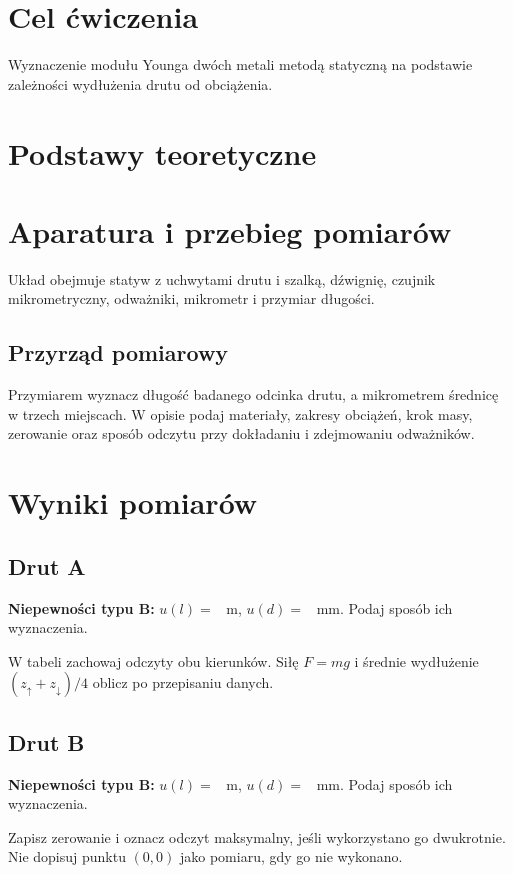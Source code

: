 \documentclass[11pt,a4paper]{article}
\begin{document}
\metryka
\section{Cel ćwiczenia}
Wyznaczenie modułu Younga dwóch metali metodą statyczną na podstawie
zależności wydłużenia drutu od obciążenia.
\section{Podstawy teoretyczne}\teoria
\section{Aparatura i przebieg pomiarów}\dzwignia
Układ obejmuje statyw z uchwytami drutu i szalką, dźwignię,
czujnik mikrometryczny, odważniki, mikrometr i przymiar długości.
\clearpage
\subsection{Przyrząd pomiarowy}
Przymiarem wyznacz długość badanego odcinka drutu, a mikrometrem
średnicę w trzech miejscach. W opisie podaj materiały, zakresy obciążeń,
krok masy, zerowanie oraz sposób odczytu przy dokładaniu i zdejmowaniu odważników.

\clearpage\section{Wyniki pomiarów}
\subsection{Drut A}
\textbf{Niepewności typu B:} $u(l)=$ \pole\ m,
$u(d)=$ \pole\ mm. Podaj sposób ich wyznaczenia.

W tabeli zachowaj odczyty obu kierunków. Siłę $F=mg$ i średnie
wydłużenie $(z_\uparrow+z_\downarrow)/4$ oblicz po przepisaniu danych.
\par\medskip\tabelaopracowania
\clearpage\subsection{Drut B}
\textbf{Niepewności typu B:} $u(l)=$ \pole\ m,
$u(d)=$ \pole\ mm. Podaj sposób ich wyznaczenia.

Zapisz zerowanie i oznacz odczyt maksymalny, jeśli wykorzystano go
dwukrotnie. Nie dopisuj punktu $(0,0)$ jako pomiaru, gdy go nie wykonano.
\par\medskip\tabelaopracowania
\end{document}
